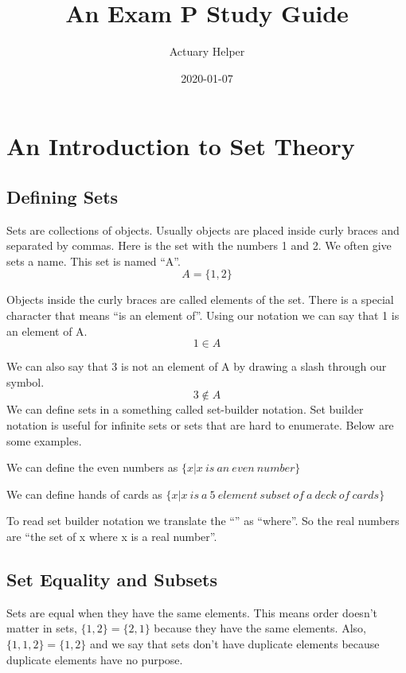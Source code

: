 \documentclass[
]{book}
\title{An Exam P Study Guide}
\author{Actuary Helper}
\date{2020-01-07}
\theoremstyle{definition}
\theoremstyle{definition}
\theoremstyle{definition}
\theoremstyle{remark}
\begin{document}
\frontmatter
\maketitle

{
\setcounter{tocdepth}{1}
\tableofcontents
}
\mainmatter
\hypertarget{an-introduction-to-set-theory}{%
\chapter{An Introduction to Set Theory}\label{an-introduction-to-set-theory}}

\hypertarget{defining-sets}{%
\section{Defining Sets}\label{defining-sets}}

Sets are collections of objects. Usually objects are placed inside curly braces and separated by commas. Here is the set with the numbers 1 and 2. We often give sets a name. This set is named ``A''. \[A=\{1,2\}\]

Objects inside the curly braces are called elements of the set. There is a special character that means ``is an element of''. Using our notation we can say that 1 is an element of A. \[1 \in A\]

We can also say that 3 is not an element of A by drawing a slash through our symbol.
\[3 \not\in A\]
We can define sets in a something called set-builder notation. Set builder notation is useful for infinite sets or sets that are hard to enumerate. Below are some examples.

We can define the even numbers as \(\{x | x \ is \  an \  even \ number\}\)

We can define hands of cards as \(\{x | x \ is \  a \ 5 \ element \ subset \ of \ a \ deck \ of \ cards\}\)

To read set builder notation we translate the ``\textbar{}'' as ``where''. So the real numbers are ``the set of x where x is a real number''.

\hypertarget{set-equality-and-subsets}{%
\section{Set Equality and Subsets}\label{set-equality-and-subsets}}

Sets are equal when they have the same elements. This means order doesn't matter in sets, \(\{1,2\} = \{2,1\}\) because they have the same elements. Also, \(\{1,1,2\} = \{1,2\}\) and we say that sets don't have duplicate elements because duplicate elements have no purpose.
\end{document}
